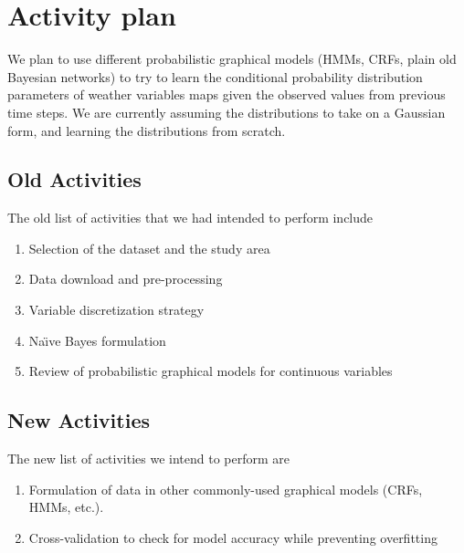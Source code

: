 \documentclass{article}
\begin{document}
\section{Activity plan}

We plan to use different probabilistic graphical models (HMMs, CRFs, plain old
Bayesian networks) to try to learn the conditional probability distribution
parameters of weather variables maps given the observed values from previous
time steps. We are currently assuming the distributions to take on a Gaussian
form, and learning the distributions from scratch.

\subsection{Old Activities}
The old list of activities that we had intended to perform include
\begin{enumerate}
\item Selection of the dataset and the study area
\item Data download and pre-processing
\item Variable discretization strategy
\item Na\"\i ve Bayes formulation
\item Review of probabilistic graphical models for continuous variables
\end{enumerate}

\subsection{New Activities}
The new list of activities we intend to perform are
\begin{enumerate}
\item Formulation of data in other commonly-used graphical models (CRFs, HMMs, etc.).
\item Cross-validation to check for model accuracy while preventing overfitting
\end{enumerate}



\end{document}
